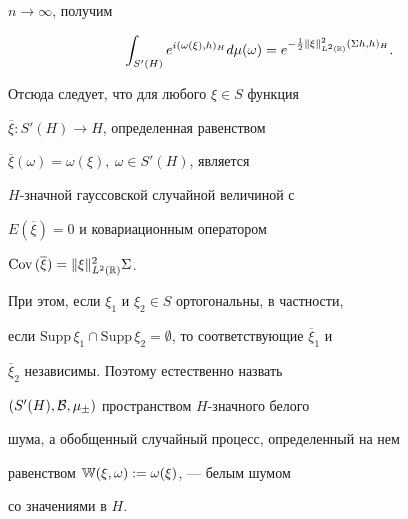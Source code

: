 \begin{exam}
$n\to\infty$, получим


$$


\int_{S'(H)}e^{i(\omega(\xi),h)_H}d\mu(\omega)=


e^{-\frac{1}{2}\|\xi\|^2_{L^2(\Bbb{R})}(\Sigma h, h)_H}.


$$


Отсюда следует, что для любого $\xi \in S$ функция


$\overline{\xi}:S'(H)\to H$, определенная равенством


$\overline{\xi}(\omega)=\omega(\xi), \ \omega\in S'(H)$, является


$H$-значной гауссовской случайной величиной с


$E(\overline{\xi})=0$ и ковариационным оператором


$\mathrm{Cov}\,(\overline{\xi})=\|\xi\|^2_{L^2(\Bbb{R})}\Sigma$.


При этом, если $\xi_1$ и $\xi_2\in S$ ортогональны, в частности,


если $\mathrm{Supp}\, \xi_1\cap\mathrm{Supp}\,


\xi_2=\emptyset$, то соответствующие $\overline{\xi}_1$ и


$\overline{\xi}_2$ независимы. Поэтому естественно назвать


$(S'(H),\cal{B},\mu_\Sigma)$ пространством $H$-значного белого


шума, а обобщенный случайный процесс, определенный на нем


равенством $\Bbb{W}(\xi,\omega):=\omega(\xi)$, --- белым шумом


со значениями в $H$.


\end{exam}





